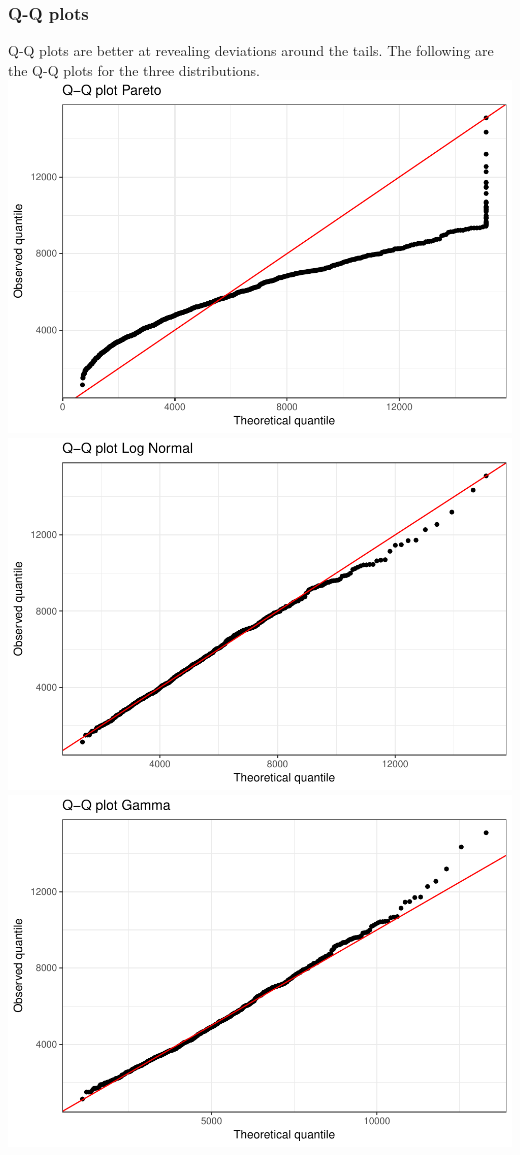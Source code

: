 \documentclass[titlepage]{article}
\begin{document}
	\subsubsection{Q-Q plots}
	Q-Q plots are better at revealing deviations around the tails. The following are the Q-Q plots for the three distributions.\\
			\includegraphics[scale=0.3]{QQ_pareto}
	\includegraphics[scale=0.3]{QQ_LN}
	\includegraphics[scale=0.3]{QQ_gamma}\\
\end{document}
